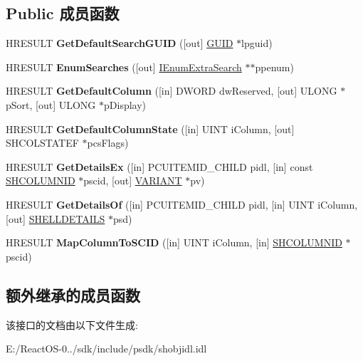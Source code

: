 \subsection*{Public 成员函数}
\begin{DoxyCompactItemize}
\item 
\mbox{\label{interface_i_shell_folder2_a64de04cd8a5afa6ceb67bb3385306e00}} 
H\+R\+E\+S\+U\+LT {\bfseries Get\+Default\+Search\+G\+U\+ID} (\mbox{[}out\mbox{]} \hyperlink{interface_g_u_i_d}{G\+U\+ID} $\ast$lpguid)
\item 
\mbox{\label{interface_i_shell_folder2_a9b3da5d3eed76b2bd3ab80f6a62bdfcf}} 
H\+R\+E\+S\+U\+LT {\bfseries Enum\+Searches} (\mbox{[}out\mbox{]} \hyperlink{interface_i_enum_extra_search}{I\+Enum\+Extra\+Search} $\ast$$\ast$ppenum)
\item 
\mbox{\label{interface_i_shell_folder2_ab9ff2d096d14ab19150dae29ab5c1ab6}} 
H\+R\+E\+S\+U\+LT {\bfseries Get\+Default\+Column} (\mbox{[}in\mbox{]} D\+W\+O\+RD dw\+Reserved, \mbox{[}out\mbox{]} U\+L\+O\+NG $\ast$p\+Sort, \mbox{[}out\mbox{]} U\+L\+O\+NG $\ast$p\+Display)
\item 
\mbox{\label{interface_i_shell_folder2_acef9f9557afed1cebba61b1d23c1418e}} 
H\+R\+E\+S\+U\+LT {\bfseries Get\+Default\+Column\+State} (\mbox{[}in\mbox{]} U\+I\+NT i\+Column, \mbox{[}out\mbox{]} S\+H\+C\+O\+L\+S\+T\+A\+T\+EF $\ast$pcs\+Flags)
\item 
\mbox{\label{interface_i_shell_folder2_ac97c3196c396292d1f79ddfd6a517f4f}} 
H\+R\+E\+S\+U\+LT {\bfseries Get\+Details\+Ex} (\mbox{[}in\mbox{]} P\+C\+U\+I\+T\+E\+M\+I\+D\+\_\+\+C\+H\+I\+LD pidl, \mbox{[}in\mbox{]} const \hyperlink{struct_i_shell_folder2_1_1_s_h_c_o_l_u_m_n_i_d}{S\+H\+C\+O\+L\+U\+M\+N\+ID} $\ast$pscid, \mbox{[}out\mbox{]} \hyperlink{structtag_v_a_r_i_a_n_t}{V\+A\+R\+I\+A\+NT} $\ast$pv)
\item 
\mbox{\label{interface_i_shell_folder2_a03d510720e62804f2f77ec23b8cb803a}} 
H\+R\+E\+S\+U\+LT {\bfseries Get\+Details\+Of} (\mbox{[}in\mbox{]} P\+C\+U\+I\+T\+E\+M\+I\+D\+\_\+\+C\+H\+I\+LD pidl, \mbox{[}in\mbox{]} U\+I\+NT i\+Column, \mbox{[}out\mbox{]} \hyperlink{struct_s_h_e_l_l_d_e_t_a_i_l_s}{S\+H\+E\+L\+L\+D\+E\+T\+A\+I\+LS} $\ast$psd)
\item 
\mbox{\label{interface_i_shell_folder2_a7d9a8405ed2c22a4e18101ff6a7f710a}} 
H\+R\+E\+S\+U\+LT {\bfseries Map\+Column\+To\+S\+C\+ID} (\mbox{[}in\mbox{]} U\+I\+NT i\+Column, \mbox{[}in\mbox{]} \hyperlink{struct_i_shell_folder2_1_1_s_h_c_o_l_u_m_n_i_d}{S\+H\+C\+O\+L\+U\+M\+N\+ID} $\ast$pscid)
\end{DoxyCompactItemize}
\subsection*{额外继承的成员函数}


该接口的文档由以下文件生成\+:\begin{DoxyCompactItemize}
\item 
E\+:/\+React\+O\+S-\/0../sdk/include/psdk/shobjidl.\+idl\end{DoxyCompactItemize}
